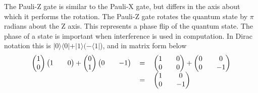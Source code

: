 \documentclass[authoryearcitations]{UoYCSproject}
\begin{document}
The Pauli-Z gate is similar to the Pauli-X gate, but differs in the axis about which it performs the rotation.
The Pauli-Z gate rotates the quantum state by $\pi$ radians about the Z axis.
This represents a phase flip of the quantum state.
The phase of a state is important when interference is used in computation.
In Dirac notation this is $\vert0\rangle
\langle0\vert + \vert1\rangle(-\langle1\vert$), and in matrix form below
\begin{equation}
\begin{tabular}{ r c l }
\(\begin {pmatrix}
1\\
0
\end{pmatrix}
\begin {pmatrix}
1&&
0
\end{pmatrix}
 + 
\begin {pmatrix}
0\\
1
\end{pmatrix}
\begin {pmatrix}
0&&
-1
\end{pmatrix}\)
& \(=\)
& \( 
\begin{pmatrix}
1 && 0 \\
0 && 0
\end{pmatrix}
 + 
\begin{pmatrix}
0 && 0\\
0 && -1
\end{pmatrix}
\) \\
& \(=\)
& \( 
\begin{pmatrix}
1 && 0 \\
0 && -1
\end{pmatrix}
\)
\end{tabular}
\end{equation}
\end{document}
